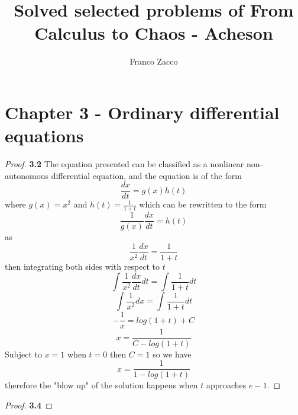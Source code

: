 \documentclass[11pt]{article}
\title{\textbf{Solved selected problems of From Calculus to Chaos - Acheson}}
\author{Franco Zacco}
\date{}
\begin{document}
\maketitle
\thispagestyle{empty}

\section*{Chapter 3 - Ordinary differential equations}

	\begin{proof}{\textbf{3.2}}
		The equation presented can be classified as a nonlinear non-autonomous
		differential equation, and the equation is of the form
		$$\frac{dx}{dt}=g(x)h(t)$$
		where $g(x)=x^{2}$ and $h(t)=\frac{1}{1+t}$ which can be rewritten to
		the form
		$$\frac{1}{g(x)}\frac{dx}{dt}=h(t)$$
		as
		$$\frac{1}{x^{2}}\frac{dx}{dt} = \frac{1}{1+t}$$
		then integrating both sides with respect to $t$
		$$\int \frac{1}{x^2}\frac{dx}{dt}dt = \int \frac{1}{1+t}dt$$
		$$\int \frac{1}{x^2}dx = \int \frac{1}{1+t}dt$$
		$$-\frac{1}{x} = log(1+t) +C$$
		$$x = \frac{1}{C - log(1+t)}$$
		Subject to $x = 1$ when $t = 0$ then $C=1$ so we have
		$$x = \frac{1}{1 - log(1+t)}$$
		therefore the "blow up" of the solution happens when $t$ approaches
		$e-1$.
	\end{proof}
	\begin{proof}{\textbf{3.4}}
		
	\end{proof}
\end{document}
